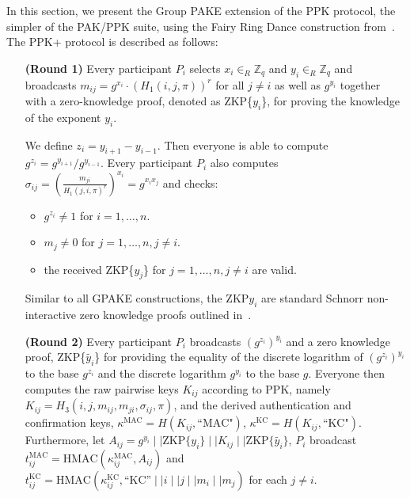In this section, we present the Group PAKE extension of the PPK protocol, the simpler of the PAK/PPK
suite, using the Fairy Ring Dance construction from~\cite{HaYiChSh15}. The PPK+ protocol is described as follows:

\begin{itemize}
    \item[\textbf{(Round 1)}] Every participant $P_i$ selects $x_i\in_R \mathbb{Z}_q$ and $y_i\in_R \mathbb{Z}_q$ and 
        broadcasts $m_{ij} = g^{x_i}\cdot (H_1(i, j, \pi))^r$ for all $j \neq i$ as well as $g^{y_i}$ together with a 
        zero-knowledge proof, denoted as ZKP\{$y_i$\}, for proving the knowledge of the exponent $y_i$.
    \item[]
    \item[] We define $z_i = y_{i+1} - y_{i-1}$. Then everyone is able to compute $g^{z_i} = g^{y_{i+1}}/g^{y_{i-1}}$. 
        Every participant $P_i$ also computes $\sigma_{ij} = \left(\frac{m_{ji}}{H_1(j,i,\pi)^r}\right)^{x_i} = g^{x_i x_j}$
        and checks:
        \begin{itemize}
            \item $g^{z_i} \neq 1$ for $i = 1, \ldots, n$.
            \item $m_j \neq 0$ for $j = 1,\ldots,n, j\neq i$.
            \item the received ZKP\{$y_j$\} for $j = 1,\ldots, n, j\neq i$ are valid.
        \end{itemize}
        Similar to all GPAKE constructions, the ZKP{$y_i$} are standard Schnorr non-interactive zero knowledge proofs outlined in~\cite{HaYiChSh15}.
    \item[]
    \item[\textbf{(Round 2)}] Every participant $P_i$ broadcasts $(g^{z_i})^{y_i}$ and a zero knowledge proof,
        ZKP\{$\tilde{y_i}$\} for providing the equality of the discrete logarithm of $(g^{z_i})^{y_i}$ to the base
        $g^{z_i}$ and the discrete logarithm $g^{y_i}$ to the base $g$. Everyone then computes the raw pairwise
        keys $K_{ij}$ according to PPK, namely $K_{ij} = H_3(i,j,m_{ij}, m_{ji}, \sigma_{ij}, \pi)$, and the derived
        authentication and confirmation keys, $\kappa^{\text{MAC}} = H(K_{ij}, \text{``MAC"})$,
        $\kappa^{\text{KC}} = H(K_{ij}, \text{``KC"})$. Furthermore, let
        $A_{ij} = g^{y_i}\mid\mid \text{ZKP}\{y_i\}\mid\mid K_{ij}\mid\mid \text{ZKP}\{\tilde{y_i}\}$,
        $P_i$ broadcast $t_{ij}^{\text{MAC}}  =\text{HMAC}(\kappa^{\text{MAC}}_{ij}, A_{ij})$ and
        $t_{ij}^{\text{KC}}  = \text{HMAC}(\kappa^{\text{KC}}_{ij}, \text{``KC''}\mid\mid i\mid\mid j \mid\mid m_i \mid\mid m_j)$ for each $j \neq i$.

\end{itemize}
